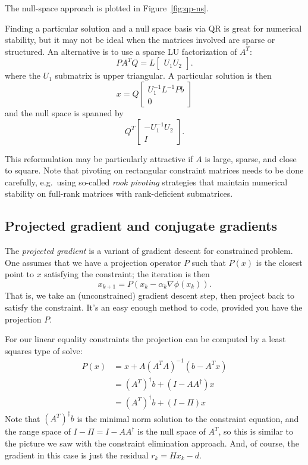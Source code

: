 \documentclass[12pt, leqno]{article} %
\begin{document}
The null-space approach is plotted in Figure~\ref{fig:qp-ns}.

Finding a particular solution and a null space basis via QR is great for
numerical stability, but it may not be ideal when the matrices involved
are sparse or structured. An alternative is to use a sparse LU
factorization of \(A^T\):
\[P A^T Q = L \begin{bmatrix} U_1 U_2 \end{bmatrix}.\] where the \(U_1\)
submatrix is upper triangular. A particular solution is then
\[x = Q \begin{bmatrix} U_1^{-1} L^{-1} P b \\ 0 \end{bmatrix}\] and the
null space is spanned by \[Q^T 
  \begin{bmatrix}
    -U_1^{-1} U_2 \\
    I
  \end{bmatrix}.\]

This reformulation may be particularly attractive if \(A\) is large,
sparse, and close to square. Note that pivoting on rectangular
constraint matrices needs to be done carefully, e.g.~using so-called
\emph{rook pivoting} strategies that maintain numerical stability on
full-rank matrices with rank-deficient submatrices.

\subsection{Projected gradient and conjugate gradients}

The \emph{projected gradient} is a variant of gradient descent for
constrained problem. One assumes that we have a projection operator
\(P\) such that \(P(x)\) is the closest point to \(x\) satisfying the
constraint; the iteration is then
\[x_{k+1} = P\left( x_k - \alpha_k \nabla \phi(x_k) \right).\] That is,
we take an (unconstrained) gradient descent step, then project back to
satisfy the constraint. It's an easy enough method to code, provided you
have the projection \(P\).

For our linear equality constraints the projection can be computed by a
least squares type of solve: \begin{align*}
  P(x) &= x + A(A^T A)^{-1} (b-A^T x) \\
       &= (A^T)^\dagger b + (I-AA^\dagger) x \\
       &= (A^T)^\dagger b + (I-\Pi) x
\end{align*} Note that \((A^T)^\dagger b\) is the minimal norm solution
to the constraint equation, and the range space of
\(I-\Pi = I-AA^\dagger\) is the null space of \(A^T\), so this is
similar to the picture we saw with the constraint elimination approach.
And, of course, the gradient in this case is just the residual
\(r_k = Hx_k - d\).
\end{document}
